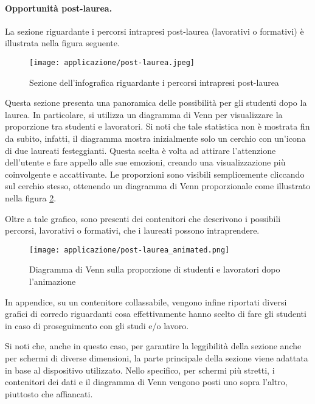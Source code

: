 \paragraph{Opportunità post-laurea.} La sezione riguardante i percorsi intrapresi post-laurea (lavorativi o formativi) è illustrata nella figura seguente. 
\begin{figure}[H] 
    \centering 
    \texttt{[image: applicazione/post-laurea.jpeg]} 
    \caption{Sezione dell'infografica riguardante i percorsi intrapresi post-laurea}
    \label{fig:app_post-laurea}
\end{figure}
\noindent Questa sezione presenta una panoramica delle possibilità per gli studenti dopo la laurea. In particolare, si utilizza un diagramma di Venn per visualizzare la 
proporzione tra studenti e lavoratori. 
Si noti che tale statistica non è mostrata fin da subito, infatti, il diagramma mostra inizialmente solo un cerchio con un'icona di due laureati festeggianti.
Questa scelta è volta ad attirare l'attenzione dell'utente e fare appello alle sue emozioni, creando una visualizzazione più coinvolgente e accattivante. 
Le proporzioni sono visibili semplicemente cliccando sul cerchio stesso, ottenendo un diagramma di Venn proporzionale come illustrato nella figura 
\ref{fig:app_post-laurea_animated}. 

Oltre a tale grafico, sono presenti dei contenitori che descrivono i possibili percorsi, lavorativi o formativi, che i laureati possono intraprendere.
\begin{figure}[H] 
    \centering 
    \texttt{[image: applicazione/post-laurea\_animated.png]} 
    \caption{Diagramma di Venn sulla proporzione di studenti e lavoratori dopo l'animazione}
    \label{fig:app_post-laurea_animated}
\end{figure}

In appendice, su un contenitore collassabile, vengono infine riportati diversi grafici di corredo riguardanti cosa effettivamente hanno scelto di fare gli studenti in caso 
di proseguimento con gli studi e/o lavoro.

\bigskip
\noindent Si noti che, anche in questo caso, per garantire la leggibilità della sezione anche per schermi di diverse dimensioni, la parte principale della sezione viene adattata 
in base al dispositivo utilizzato. Nello specifico, per schermi più stretti, i contenitori dei dati e il diagramma di Venn vengono posti uno sopra l'altro, piuttosto che affiancati.

